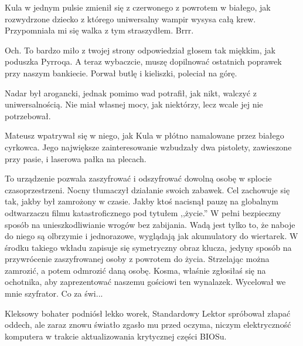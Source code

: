 Kula w jednym pulsie zmienił się z czerwonego z powrotem w białego, jak rozwydrzone dziecko z którego uniwersalny wampir wysysa całą krew.
Przypomniała mi się walka z tym straszydłem. Brrr.

\begin{dialogue}
\ds{} Och. To bardzo miło z twojej strony \dm{} odpowiedział głosem tak miękkim, jak poduszka Pyrroqa. \dm{} A teraz wybaczcie, muszę dopilnować ostatnich poprawek przy naszym bankiecie. \dm{}
Porwał butlę i kieliszki, poleciał na górę.
\end{dialogue}

Nadar był arogancki, jednak pomimo wad potrafił, jak nikt, walczyć z uniwersalnością.
Nie miał własnej mocy, jak niektórzy, lecz wcale jej nie potrzebował.

Mateusz wpatrywał się w niego, jak Kula w płótno namalowane przez białego cyrkowca.
Jego największe zainteresowanie wzbudzały dwa pistolety, zawieszone przy pasie, i laserowa pałka na plecach.

\begin{dialogue}
\ds{} To urządzenie pozwala zaszyfrować i odszyfrować dowolną osobę w splocie czasoprzestrzeni. \dm{} Nocny tłumaczył działanie swoich zabawek. \dm{}
Cel zachowuje się tak, jakby był zamrożony w czasie. Jakby ktoś nacisnął pauzę na globalnym odtwarzaczu filmu katastroficznego pod tytułem ,,życie.''
W pełni bezpieczny sposób na unieszkodliwianie wrogów bez zabijania.
Wadą jest tylko to, że naboje do niego są olbrzymie i jednorazowe, wyglądają jak akumulatory do wiertarek.
W środku takiego wkładu zapisuje się symetryczny obraz klucza, jedyny sposób na przywrócenie zaszyfrowanej osoby z powrotem do życia.
Strzelając można zamrozić, a potem odmrozić daną osobę.
Kosma, właśnie zgłosiłaś się na ochotnika, aby zaprezentować naszemu gościowi ten wynalazek. \dm{} Wycelował we mnie szyfrator. Co za świ...
\end{dialogue}

\divider{}

Kleksowy bohater podniósł lekko worek, Standardowy Lektor spróbował złapać oddech, ale zaraz znowu światło zgasło mu przed oczyma, 
niczym elektryczność komputera w trakcie aktualizowania krytycznej części BIOSu.

\divider{}

